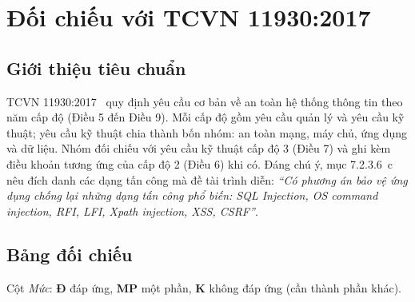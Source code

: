 \chapter{Đối chiếu với TCVN 11930:2017}\label{chap:tcvn}

\section{Giới thiệu tiêu chuẩn}
TCVN 11930:2017~\cite{tcvn11930} quy định yêu cầu cơ bản về an toàn hệ thống thông tin theo năm cấp độ (Điều 5 đến Điều 9). Mỗi cấp độ gồm yêu cầu quản lý và yêu cầu kỹ thuật; yêu cầu kỹ thuật chia thành bốn nhóm: an toàn mạng, máy chủ, ứng dụng và dữ liệu. Nhóm đối chiếu với yêu cầu kỹ thuật cấp độ 3 (Điều 7) và ghi kèm điều khoản tương ứng của cấp độ 2 (Điều 6) khi có. Đáng chú ý, mục 7.2.3.6~c nêu đích danh các dạng tấn công mà đề tài trình diễn: \textit{``Có phương án bảo vệ ứng dụng chống lại những dạng tấn công phổ biến: SQL Injection, OS command injection, RFI, LFI, Xpath injection, XSS, CSRF''}.

\section{Bảng đối chiếu}
Cột \textit{Mức}: \textbf{Đ} đáp ứng, \textbf{MP} một phần, \textbf{K} không đáp ứng (cần thành phần khác).

